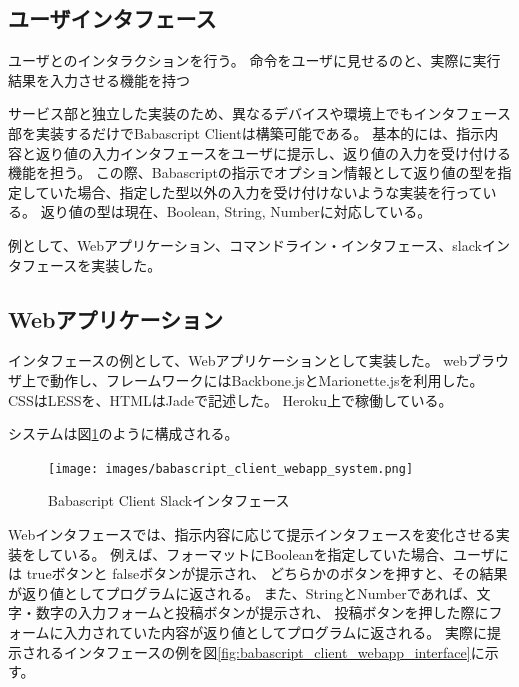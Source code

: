 \subsection{ユーザインタフェース}\label{ux30e6ux30fcux30b6ux30a4ux30f3ux30bfux30d5ux30a7ux30fcux30b9}

ユーザとのインタラクションを行う。
命令をユーザに見せるのと、実際に実行結果を入力させる機能を持つ

サービス部と独立した実装のため、異なるデバイスや環境上でもインタフェース部を実装するだけでBabascript
Clientは構築可能である。
基本的には、指示内容と返り値の入力インタフェースをユーザに提示し、返り値の入力を受け付ける機能を担う。
この際、Babascriptの指示でオプション情報として返り値の型を指定していた場合、指定した型以外の入力を受け付けないような実装を行っている。
返り値の型は現在、Boolean, String, Numberに対応している。

例として、Webアプリケーション、コマンドライン・インタフェース、slackインタフェースを実装した。

\subsection{Webアプリケーション}\label{webux30a2ux30d7ux30eaux30b1ux30fcux30b7ux30e7ux30f3}

インタフェースの例として、Webアプリケーションとして実装した。
webブラウザ上で動作し、フレームワークにはBackbone.jsとMarionette.jsを利用した。
CSSはLESSを、HTMLはJadeで記述した。 Heroku上で稼働している。

システムは図\ref{fig:babascript_client_webapp_system}のように構成される。

\begin{figure}[htbp]
  \begin{center}
  \texttt{[image: images/babascript\_client\_webapp\_system.png]}
  \end{center}
  \caption{Babascript Client Slackインタフェース}
  \label{fig:babascript_client_webapp_system}
\end{figure}

Webインタフェースでは、指示内容に応じて提示インタフェースを変化させる実装をしている。
例えば、フォーマットにBooleanを指定していた場合、ユーザには trueボタンと
falseボタンが提示され、
どちらかのボタンを押すと、その結果が返り値としてプログラムに返される。
また、StringとNumberであれば、文字・数字の入力フォームと投稿ボタンが提示され、
投稿ボタンを押した際にフォームに入力されていた内容が返り値としてプログラムに返される。
実際に提示されるインタフェースの例を図\ref{fig:babascript_client_webapp_interface}に示す。

